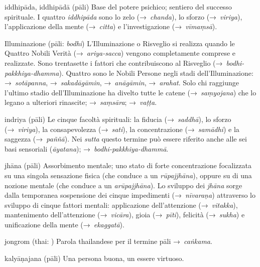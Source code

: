 \begin{glossarydescription}

\item[iddhipāda, iddhipādā] (pāli)\label{glossary-iddhipada} Base del potere psichico; sentiero del
  successo spirituale. I quattro \emph{iddhipāda} sono lo zelo
  (→~\emph{chanda}), lo sforzo (→~\emph{viriya}), l'applicazione della mente
  (→~\emph{citta}) e l'investigazione (→~\emph{vīmaṃsā}).

\item[Illuminazione] (pāli: \emph{bodhi}) L'Illuminazione o Risveglio si
  realizza quando le Quattro Nobili Verità (→~\emph{ariya-sacca}) vengono
  completamente comprese e realizzate. Sono trentasette i fattori che
  contribuiscono al Risveglio (→~\emph{bodhi-pakkhiya-dhamma}). Quattro sono le
  Nobili Persone negli stadi dell'Illuminazione: →~\emph{sotāpanna},
  →~\emph{sakadāgāmin}, →~\emph{anāgāmin}, →~\emph{arahat}. Solo chi raggiunge
  l'ultimo stadio dell'Illuminazione ha divelto tutte le catene
  (→~\emph{saṃyojana}) che lo legano a ulteriori rinascite; →~\emph{saṃsāra};
  →~\emph{vaṭṭa}.

\item[indriya] (pāli) Le cinque facoltà spirituali: la fiducia
  (→~\emph{saddhā}), lo sforzo (→~\emph{viriya}), la consapevolezza
  (→~\emph{sati}), la concentrazione (→~\emph{samādhi}) e la saggezza
  (→~\emph{paññā}). Nei \emph{sutta} questo termine può essere riferito anche
  alle sei basi sensoriali (\emph{āyatana}); →~\emph{bodhi-pakkhiya-dhammā}.


\item[jhāna] (pāli) Assorbimento mentale; uno stato di forte concentrazione
  focalizzata su una singola sensazione fisica (che conduce a un
  \emph{rūpajjhāna}), oppure su di una nozione mentale (che conduce a un
  \emph{arūpajjhāna}). Lo sviluppo dei \emph{jhāna} sorge dalla temporanea
  sospensione dei cinque impedimenti (→~\emph{nīvaraṇa}) attraverso lo sviluppo
  di cinque fattori mentali: applicazione dell'attenzione (→~\emph{vitakka}),
  mantenimento dell'attenzione (→~\emph{vicāra}), gioia (→~\emph{pīti}),
  felicità (→~\emph{sukha}) e unificazione della mente (→~\emph{ekaggatā}).

\item[jongrom] (thai: ) Parola thailandese per il termine
  pāli →~\emph{caṅkama}.


\item[kalyāṇajana] (pāli) Una persona buona, un essere virtuoso.


\end{glossarydescription}
